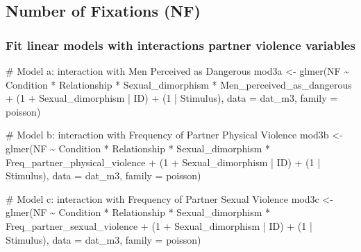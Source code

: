 \documentclass[
  bookmarksnumbered]{article}
\newenvironment{Shaded}{\begin{snugshade}}{\end{snugshade}}
\newcommand{\AttributeTok}[1]{\textcolor[rgb]{0.80,0.80,0.80}{#1}}
\newcommand{\CommentTok}[1]{\textcolor[rgb]{0.50,0.62,0.50}{#1}}
\newcommand{\DecValTok}[1]{\textcolor[rgb]{0.86,0.86,0.80}{#1}}
\newcommand{\FunctionTok}[1]{\textcolor[rgb]{0.94,0.94,0.56}{#1}}
\newcommand{\NormalTok}[1]{\textcolor[rgb]{0.80,0.80,0.80}{#1}}
\newcommand{\OtherTok}[1]{\textcolor[rgb]{0.94,0.94,0.56}{#1}}
\newcommand{\SpecialCharTok}[1]{\textcolor[rgb]{0.86,0.64,0.64}{#1}}
\begin{document}
\subsection{Number of Fixations (NF)}\label{number-of-fixations-nf-1}

\subsubsection{Fit linear models with interactions partner violence variables}\label{fit-linear-models-with-interactions-partner-violence-variables-2}

\begin{Shaded}
\begin{Highlighting}[]
\CommentTok{\# Model a: interaction with Men Perceived as Dangerous}
\NormalTok{mod3a }\OtherTok{\textless{}{-}} \FunctionTok{glmer}\NormalTok{(NF }\SpecialCharTok{\textasciitilde{}}
\NormalTok{                Condition }\SpecialCharTok{*}\NormalTok{ Relationship }\SpecialCharTok{*}\NormalTok{ Sexual\_dimorphism }\SpecialCharTok{*}\NormalTok{ Men\_perceived\_as\_dangerous }\SpecialCharTok{+}
\NormalTok{                (}\DecValTok{1} \SpecialCharTok{+}\NormalTok{ Sexual\_dimorphism }\SpecialCharTok{|}\NormalTok{ ID) }\SpecialCharTok{+}\NormalTok{ (}\DecValTok{1} \SpecialCharTok{|}\NormalTok{ Stimulus), }
              \AttributeTok{data =}\NormalTok{ dat\_m3,}
              \AttributeTok{family =}\NormalTok{ poisson)}

\CommentTok{\# Model b: interaction with Frequency of Partner Physical Violence}
\NormalTok{mod3b }\OtherTok{\textless{}{-}} \FunctionTok{glmer}\NormalTok{(NF }\SpecialCharTok{\textasciitilde{}}
\NormalTok{                Condition }\SpecialCharTok{*}\NormalTok{ Relationship }\SpecialCharTok{*}\NormalTok{ Sexual\_dimorphism }\SpecialCharTok{*}\NormalTok{ Freq\_partner\_physical\_violence }\SpecialCharTok{+}
\NormalTok{                (}\DecValTok{1} \SpecialCharTok{+}\NormalTok{ Sexual\_dimorphism }\SpecialCharTok{|}\NormalTok{ ID) }\SpecialCharTok{+}\NormalTok{ (}\DecValTok{1} \SpecialCharTok{|}\NormalTok{ Stimulus), }
              \AttributeTok{data =}\NormalTok{ dat\_m3,}
              \AttributeTok{family =}\NormalTok{ poisson)}

\CommentTok{\# Model c: interaction with Frequency of Partner Sexual Violence}
\NormalTok{mod3c }\OtherTok{\textless{}{-}} \FunctionTok{glmer}\NormalTok{(NF }\SpecialCharTok{\textasciitilde{}}
\NormalTok{                Condition }\SpecialCharTok{*}\NormalTok{ Relationship }\SpecialCharTok{*}\NormalTok{ Sexual\_dimorphism }\SpecialCharTok{*}\NormalTok{ Freq\_partner\_sexual\_violence }\SpecialCharTok{+}
\NormalTok{                (}\DecValTok{1} \SpecialCharTok{+}\NormalTok{ Sexual\_dimorphism }\SpecialCharTok{|}\NormalTok{ ID) }\SpecialCharTok{+}\NormalTok{ (}\DecValTok{1} \SpecialCharTok{|}\NormalTok{ Stimulus), }
              \AttributeTok{data =}\NormalTok{ dat\_m3,}
              \AttributeTok{family =}\NormalTok{ poisson)}


\end{Highlighting}
\end{Shaded}
\end{document}
